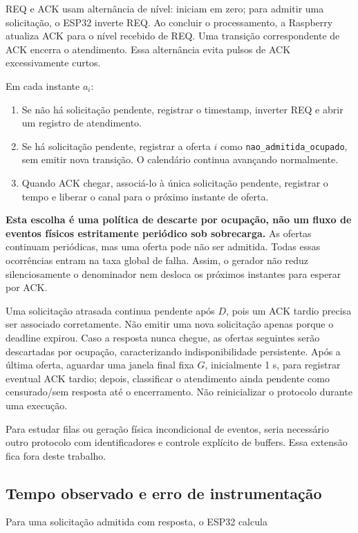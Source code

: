 \documentclass[11pt,a4paper]{article}
\begin{document}
REQ e ACK usam alternância de nível: iniciam em zero; para admitir uma solicitação, o ESP32 inverte REQ. Ao concluir o processamento, a Raspberry atualiza ACK para o nível recebido de REQ. Uma transição correspondente de ACK encerra o atendimento. Essa alternância evita pulsos de ACK excessivamente curtos.

Em cada instante $a_i$:
\begin{enumerate}
\item Se não há solicitação pendente, registrar o timestamp, inverter REQ e abrir um registro de atendimento.
\item Se há solicitação pendente, registrar a oferta $i$ como \texttt{nao\_admitida\_ocupado}, sem emitir nova transição. O calendário continua avançando normalmente.
\item Quando ACK chegar, associá-lo à única solicitação pendente, registrar o tempo e liberar o canal para o próximo instante de oferta.
\end{enumerate}

\textbf{Esta escolha é uma política de descarte por ocupação, não um fluxo de eventos físicos estritamente periódico sob sobrecarga.} As ofertas continuam periódicas, mas uma oferta pode não ser admitida. Todas essas ocorrências entram na taxa global de falha. Assim, o gerador não reduz silenciosamente o denominador nem desloca os próximos instantes para esperar por ACK.

Uma solicitação atrasada continua pendente após $D$, pois um ACK tardio precisa ser associado corretamente. Não emitir uma nova solicitação apenas porque o deadline expirou. Caso a resposta nunca chegue, as ofertas seguintes serão descartadas por ocupação, caracterizando indisponibilidade persistente. Após a última oferta, aguardar uma janela final fixa $G$, inicialmente 1 s, para registrar eventual ACK tardio; depois, classificar o atendimento ainda pendente como censurado/sem resposta até o encerramento. Não reinicializar o protocolo durante uma execução.

Para estudar filas ou geração física incondicional de eventos, seria necessário outro protocolo com identificadores e controle explícito de buffers. Essa extensão fica fora deste trabalho.

\subsection{Tempo observado e erro de instrumentação}

Para uma solicitação admitida com resposta, o ESP32 calcula
\end{document}
